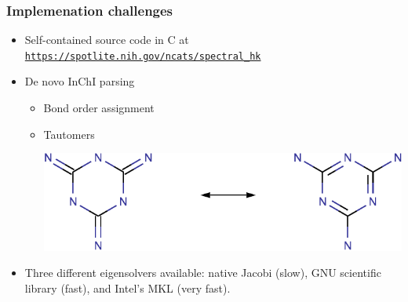 \documentclass{beamer}
\begin{document}
\begin{frame}
  \frametitle{Implemenation challenges}
  \begin{itemize}
    \item Self-contained source code in C at
      \href{https://spotlite.nih.gov/ncats/spectral\_hk}{\texttt{https://spotlite.nih.gov/ncats/spectral\_hk}}
    \item De novo InChI parsing
      \begin{itemize}
      \item Bond order assignment
      \item Tautomers
        \begin{block}{}
          \centerline{\includegraphics[width=3 true in]{tau-crop}}
        \end{block}
      \end{itemize}
    \item Three different eigensolvers available: native Jacobi
      (slow), GNU scientific library (fast), and Intel's MKL (very
      fast).
  \end{itemize}
\end{frame}
\end{document}
